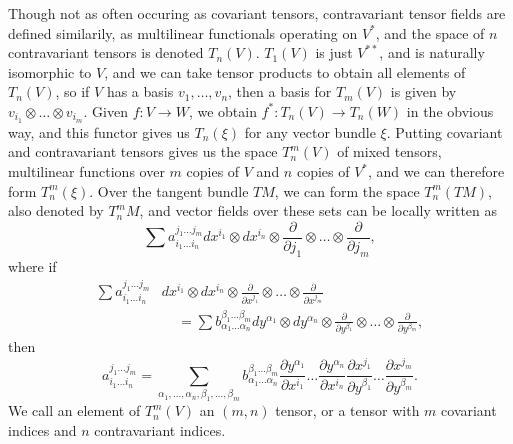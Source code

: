 Though not as often occuring as covariant tensors, contravariant tensor fields are defined similarily, as multilinear functionals operating on $V^*$, and the space of $n$ contravariant tensors is denoted $T_n(V)$. $T_1(V)$ is just $V^{**}$, and is naturally isomorphic to $V$, and we can take tensor products to obtain all elements of $T_n(V)$, so if $V$ has a basis $v_1, \dots, v_n$, then a basis for $T_m(V)$ is given by $v_{i_1} \otimes \dots \otimes v_{i_m}$. Given $f: V \to W$, we obtain $f^*: T_n(V) \to T_n(W)$ in the obvious way, and this functor gives us $T_n(\xi)$ for any vector bundle $\xi$. Putting covariant and contravariant tensors gives us the space $T_n^m(V)$ of mixed tensors, multilinear functions over $m$ copies of $V$ and $n$ copies of $V^*$, and we can therefore form $T^m_n(\xi)$. Over the tangent bundle $TM$, we can form the space $T_n^m(TM)$, also denoted by $T^m_n M$, and vector fields over these sets can be locally written as
%
\[ \sum a_{i_1 \dots i_n}^{j_1 \dots j_m} dx^{i_1} \otimes dx^{i_n} \otimes \frac{\partial}{\partial j_1} \otimes \dots \otimes \frac{\partial}{\partial j_m}, \]
%
where if
%
\begin{align*}
    \sum a_{i_1 \dots i_n}^{j_1 \dots j_m} & dx^{i_1} \otimes dx^{i_n} \otimes \frac{\partial}{\partial x^{j_1}} \otimes \dots \otimes \frac{\partial}{\partial x^{j_m}}\\
    &\ \ \ \ \ = \sum b_{\alpha_1 \dots \alpha_n}^{\beta_1 \dots \beta_m} dy^{\alpha_1} \otimes dy^{\alpha_n} \otimes \frac{\partial}{\partial y^{\beta_1}} \otimes \dots \otimes \frac{\partial}{\partial y^{\beta_m}},
\end{align*}
%
then
%
\[ a_{i_1 \dots i_n}^{j_1 \dots j_m} = \sum_{\alpha_1, \dots, \alpha_n, \beta_1, \dots, \beta_m} b_{\alpha_1 \dots \alpha_n}^{\beta_1 \dots \beta_m} \frac{\partial y^{\alpha_1}}{\partial x^{i_1}} \dots \frac{\partial y^{\alpha_n}}{\partial x^{i_n}} \frac{\partial x^{j_1}}{\partial y^{\beta_1}} \dots \frac{\partial x^{j_m}}{\partial y^{\beta_m}}. \]
%
We call an element of $T_n^m(V)$ an $(m,n)$ tensor, or a tensor with $m$ covariant indices and $n$ contravariant indices.

